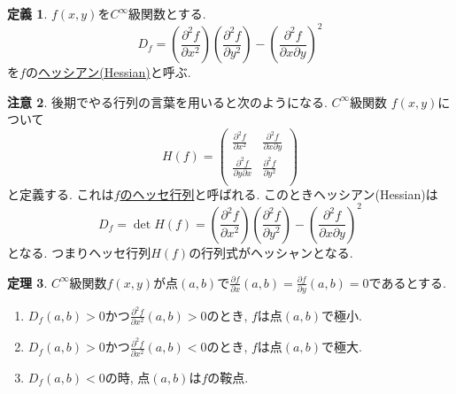 \documentclass[dvipdfmx,a4paper,11pt]{article}
\theoremstyle{definition}
\newtheorem{thm}{定理}
\newtheorem{dfn}[thm]{定義}
\newtheorem{rem}[thm]{注意}
\newcommand{\pdrv}[2]{\frac{\partial #1}{\partial #2}}
\newcommand{\ppdrv}[3]{\frac{\partial #1}{\partial #2 \partial #3}}
\begin{document}
\begin{tcolorbox}[
    colback = white,
    colframe = green!35!black,
    fonttitle = \bfseries,
    breakable = true]
    \begin{dfn}
    $f(x,y)$を$C^{\infty}$級関数とする.
$$
D_f  = \left(\pdrv{^2f}{x^2}\right)\left(\pdrv{^2f}{y^2}\right)-\left(\ppdrv{^2 f}{x}{y}\right)^2
$$
を$f$の\underline{ヘッシアン(Hessian)}と呼ぶ. 
    \end{dfn}
    \end{tcolorbox}
    
    \begin{rem}
  後期でやる行列の言葉を用いると次のようになる. 
$C^{\infty}$級関数 $f(x,y)$について
$$H(f) = \left(\begin{array}{cc} \pdrv{^2f}{x^2}& \ppdrv{^2 f}{x}{y}\\ 
\ppdrv{^2 f}{y}{x}& \pdrv{^2f}{y^2}\\ \end{array} \right)$$
と定義する. これは\underline{$f$のヘッセ行列}と呼ばれる.
このときヘッシアン(Hessian)は
$$
D_f = \det H(f) = \left(\pdrv{^2f}{x^2}\right)\left(\pdrv{^2f}{y^2}\right)-\left(\ppdrv{^2 f}{x}{y}\right)^2
$$
となる. つまりヘッセ行列$H(f)$の行列式がヘッシャンとなる. 
\end{rem}

    
 \begin{tcolorbox}[
    colback = white,
    colframe = green!35!black,
    fonttitle = \bfseries,
    breakable = true]
    \begin{thm}
    \label{kyokuchi}
   $C^\infty$級関数$f(x,y)$が点$(a,b)$で$\pdrv{f}{x}(a,b) = \pdrv{f}{y}(a,b) = 0$であるとする.
   
   \begin{enumerate}
       \setlength{\parskip}{0cm} 
  \setlength{\itemsep}{0cm}
   \item $D_f(a,b) >0$かつ$\pdrv{^2f}{x^2}(a,b) >0$のとき, $f$は点$(a,b)$で極小.
   \item $D_f(a,b) >0$かつ$\pdrv{^2f}{x^2}(a,b) <0$のとき, $f$は点$(a,b)$で極大.
   \item $D_f(a,b) <0$の時, 点$(a,b)$は$f$の鞍点.
   \end{enumerate}
       \end{thm}
    \end{tcolorbox}
\end{document}
